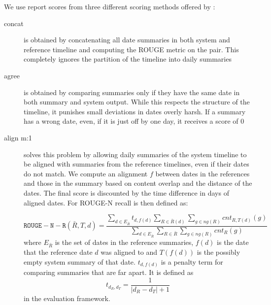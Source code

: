\documentclass[a4paper,BCOR=10mm]{report}
\numberwithin{lemma}{chapter}
\numberwithin{definition}{chapter}
\begin{document}
We use report scores from three different scoring methods offered by \citet{tilse}:
\begin{description}
\item[concat] {is obtained by concatenating all date summaries in both system and reference timeline and computing the ROUGE metric on the pair.
This completely ignores the partition of the timeline into daily summaries}
\item[agree] {is obtained by comparing summaries only if they have the same date in both summary and system output. While this respects the structure of the timeline, it punishes small deviations in dates overly harsh. If a summary has a wrong date, even, if it is just off by one day, it receives a score of $0$}
\item[align m:1] {solves this problem by allowing daily summaries of the system timeline to be aligned with summaries from the reference timelines, even if their dates do not match. We compute an alignment $f$ between dates in the references and those in the summary based on content overlap and the distance of the dates.
The final score is discounted by the time difference in days of aligned dates. For ROUGE-N recall is then defined as:

\begin{equation}
    \mathtt{ROUGE-N-R}(\bar{R}, T, d) =  \frac{
        \sum_{d \in E_{\bar{R}}} t_{d, f(d)}
        \sum_{R \in \bar{R}(d)}
        \sum_{g \in \mathit{ng}(R)}
        \mathit{cnt}_{R,T(d)}(g)
    }{
        \sum_{d \in E_{\bar{R}}}
        \sum_{R \in \bar{R}}
        \sum_{g \in \mathit{ng}(R)}
        \mathit{cnt}_R(g)
    }
\end{equation}
where $E_{\bar{R}}$ is the set of dates in the reference summaries,
$f(d)$ is the date that the reference date $d$ was aligned to and $T(f(d))$ is the possibly empty system summary of that date.
$t_{d,f(d)}$ is a penalty term for comparing summaries that are far apart.
It is defined as
\begin{equation}
t_{d_R, d_T} = \frac{1}{|d_R - d_T| + 1}
\end{equation}
in the evaluation framework.


 }
\end{description}
\end{document}
